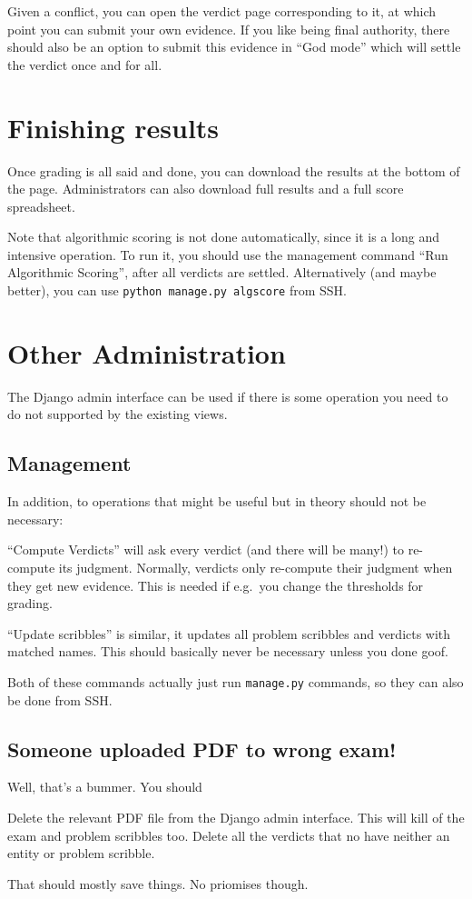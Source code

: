 Given a conflict, you can open the verdict page corresponding to it,
at which point you can submit your own evidence.
If you like being final authority,
there should also be an option to submit this evidence in ``God mode''
which will settle the verdict once and for all.
\section{Finishing results}
Once grading is all said and done,
you can download the results at the bottom of the page.
Administrators can also download full results
and a full score spreadsheet.

Note that algorithmic scoring is not done automatically,
since it is a long and intensive operation.
To run it, you should use the management command
``Run Algorithmic Scoring'',
after all verdicts are settled.
Alternatively (and maybe better), you can use
\verb+python manage.py algscore+ from SSH.

\section{Other Administration}
The Django admin interface can be used if there
is some operation you need to do not supported by the existing views.

\subsection{Management}
In addition, to operations that might be useful
but in theory should not be necessary:
\begin{itemize}
	\ii ``Compute Verdicts'' will ask every verdict (and there will be many!)
	to re-compute its judgment.
	Normally, verdicts only re-compute their judgment when they get new evidence.
	This is needed if e.g.\ you change the thresholds for grading.

	\ii ``Update scribbles'' is similar,
	it updates all problem scribbles and verdicts
	with matched names.
	This should basically never be necessary unless you done goof.
\end{itemize}
Both of these commands actually just run \verb+manage.py+ commands,
so they can also be done from SSH.

\subsection{Someone uploaded PDF to wrong exam!}
Well, that's a bummer.  You should
\begin{itemize}
	\ii Delete the relevant PDF file from the Django admin interface.
	This will kill of the exam and problem scribbles too.
	\ii Delete all the verdicts that no have neither an entity or problem scribble.
\end{itemize}
That should mostly save things. No priomises though.
